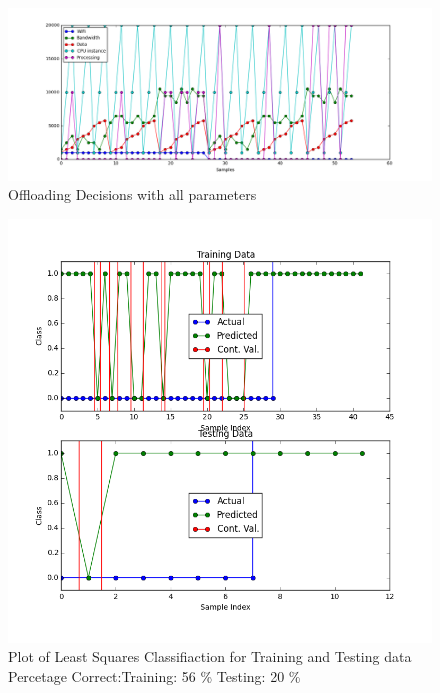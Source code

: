 \documentclass{article}
\begin{document}
\begin{figure}[h!]
  \centering
  \includegraphics[width=6in]{test3png.png}
  \caption{Offloading Decisions with all parameters}
  \label{fig:test3png}
\end{figure}
\begin{figure}[h!]
  \centering
  \includegraphics[width=5in]{leastsquares.png}
  \caption{Plot of Least Squares Classifiaction for Training and Testing data \\
Percetage Correct:Training: 56 \% Testing: 20 \%}
  \label{fig:leastsquares}
\end{figure}
\end{document}
